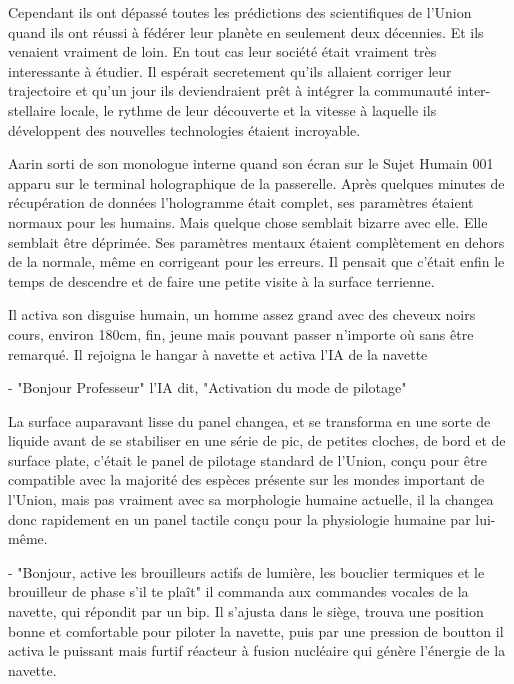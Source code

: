 \documentclass[12pt,colorlinks,a4paper]{book}
\begin{document}
Cependant ils ont dépassé toutes les prédictions des scientifiques de l'Union quand ils ont réussi à fédérer leur planète 
en seulement deux décennies. Et ils venaient vraiment de loin. En tout cas leur société était vraiment très interessante 
à étudier. Il espérait secretement qu'ils allaient corriger leur trajectoire et qu'un jour ils deviendraient prêt à intégrer
la communauté inter-stellaire locale, le rythme de leur découverte et la vitesse à laquelle ils développent des nouvelles 
technologies étaient incroyable.\par 
\bigskip

Aarin sorti de son monologue interne quand son écran sur le Sujet Humain 001 apparu sur le terminal holographique de la 
passerelle. Après quelques minutes de récupération de données l'hologramme était complet, ses paramètres étaient normaux pour 
les humains. Mais quelque chose semblait bizarre avec elle. Elle semblait être déprimée. Ses paramètres mentaux étaient 
complètement en dehors de la normale, même en corrigeant pour les erreurs. Il pensait que c'était enfin le temps de descendre 
et de faire une petite visite à la surface terrienne.\par 
\bigskip 

Il activa son \gls{disguise} humain, un homme assez grand avec des cheveux noirs cours, environ 180cm, fin, 
jeune mais pouvant passer n'importe où sans être remarqué. Il rejoigna le hangar à navette et activa l'IA de la navette\par 
\bigskip

- "Bonjour Professeur" l'IA dit, "Activation du mode de pilotage"\par 
\bigskip 
La surface auparavant lisse du panel changea, et se transforma en une sorte de liquide avant de 
se stabiliser en une série de pic, de petites cloches, de bord et de surface plate, c'était le panel de pilotage 
standard de l'Union, conçu pour être compatible avec la majorité des espèces présente sur les mondes important de 
l'Union, mais pas vraiment avec sa morphologie humaine actuelle, il la changea donc rapidement en un panel tactile
conçu pour la physiologie humaine par lui-même.\par 
\bigskip

- "Bonjour, active les brouilleurs actifs de lumière, les bouclier termiques et le brouilleur de phase s'il te plaît"
il commanda aux commandes vocales de la navette, qui répondit par un bip. 
Il s'ajusta dans le siège, trouva une position bonne et comfortable pour piloter la navette, puis par une pression de boutton
il activa le puissant mais furtif réacteur à fusion nucléaire qui génère l'énergie de la navette.\par 
\bigskip
\end{document}
